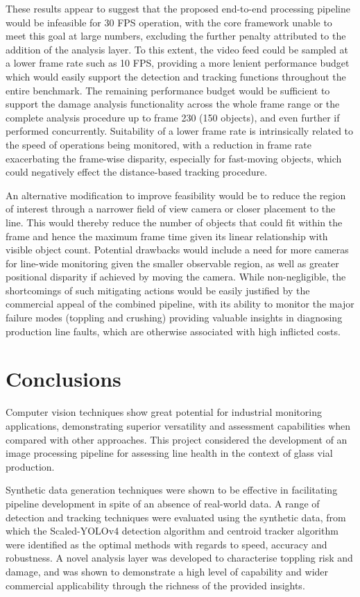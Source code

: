 \documentclass[10pt]{article}
\begin{document}
These results appear to suggest that the proposed end-to-end processing pipeline would be infeasible for 30 FPS operation, with the core framework unable to meet this goal at large numbers, excluding the further penalty attributed to the addition of the analysis layer. To this extent, the video feed could be sampled at a lower frame rate such as 10 FPS, providing a more lenient performance budget which would easily support the detection and tracking functions throughout the entire benchmark. The remaining performance budget would be sufficient to support the damage analysis functionality across the whole frame range or the complete analysis procedure up to frame 230 (150 objects), and even further if performed concurrently. Suitability of a lower frame rate is intrinsically related to the speed of operations being monitored, with a reduction in frame rate exacerbating the frame-wise disparity, especially for fast-moving objects, which could negatively effect the distance-based tracking procedure. 

An alternative modification to improve feasibility would be to reduce the region of interest through a narrower field of view camera or closer placement to the line. This would thereby reduce the number of objects that could fit within the frame and hence the maximum frame time given its linear relationship with visible object count. Potential drawbacks would include a need for more cameras for line-wide monitoring given the smaller observable region, as well as greater positional disparity if achieved by moving the camera. While non-negligible, the shortcomings of such mitigating actions would be easily justified by the commercial appeal of the combined pipeline, with its ability to monitor the major failure modes (toppling and crushing) providing valuable insights in diagnosing production line faults, which are otherwise associated with high inflicted costs.


\section{Conclusions}
Computer vision techniques show great potential for industrial monitoring applications, demonstrating superior versatility and assessment capabilities when compared with other approaches. This project considered the development of an image processing pipeline for assessing line health in the context of glass vial production. 

Synthetic data generation techniques were shown to be effective in facilitating pipeline development in spite of an absence of real-world data. A range of detection and tracking techniques were evaluated using the synthetic data, from which the Scaled-YOLOv4 detection algorithm and centroid tracker algorithm were identified as the optimal methods with regards to speed, accuracy and robustness. A novel analysis layer was developed to characterise toppling risk and damage, and was shown to demonstrate a high level of capability and wider commercial applicability through the richness of the provided insights.
\end{document}
